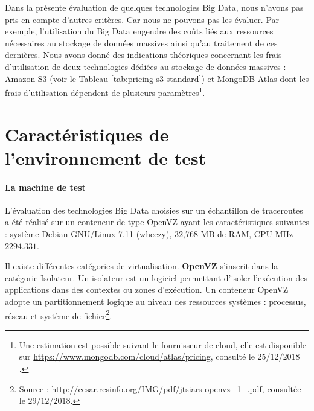 Dans la présente évaluation de quelques technologies Big Data, nous n'avons pas pris en compte d'autres critères. Car nous ne pouvons pas les évaluer. Par exemple, l'utilisation du  Big Data engendre des coûts  liés aux ressources nécessaires au stockage de données massives ainsi qu'au traitement de ces dernières. Nous avons donné des indications théoriques concernant les frais d'utilisation de deux technologies dédiées au stockage de données massives : Amazon S3 (voir le Tableau \ref{tab:pricing-s3-standard}) et MongoDB Atlas dont les frais d'utilisation  dépendent de plusieurs paramètres\footnote{Une estimation est possible suivant le fournisseur de cloud, elle est disponible  sur \url{https://www.mongodb.com/cloud/atlas/pricing}, consulté le $25/12/2018$.}. 

\section{Caractéristiques de l'environnement de test} \label{machine-openvz-caracteritics}

\paragraph{La machine de test} L'évaluation des technologies Big Data choisies sur un échantillon de traceroutes a été réalisé sur un conteneur de type OpenVZ ayant les caractéristiques suivantes :  système Debian GNU/Linux 7.11 (wheezy),  32,768 MB de  RAM, CPU MHz $ 2294.331 $.

\begin{tcolorbox}
	Il existe différentes catégories de virtualisation. \textbf{OpenVZ} s'inscrit dans la catégorie Isolateur. Un isolateur est un logiciel permettant d'isoler l'exécution des applications dans des contextes ou zones d'exécution. Un conteneur OpenVZ  adopte un partitionnement logique au niveau des ressources systèmes : processus, réseau et système de fichier\footnote{Source : \url{http://cesar.resinfo.org/IMG/pdf/jtsiars-openvz_1_.pdf}, consultée le $29/12/2018$.}.
\end{tcolorbox}

